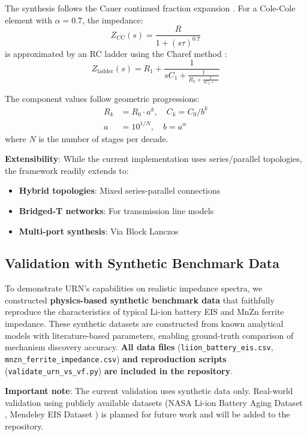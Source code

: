 \documentclass{ieeeaccess}
\begin{document}
The synthesis follows the Cauer continued fraction expansion \cite{cauer1958synthesis}. For a Cole-Cole element with $\alpha = 0.7$, the impedance:
\begin{equation}
Z_{\text{CC}}(s) = \frac{R}{1 + (s\tau)^{0.7}}
\end{equation}
is approximated by an RC ladder using the Charef method \cite{charef1992fractal}:
\begin{equation}
Z_{\text{ladder}}(s) = R_1 + \frac{1}{sC_1 + \frac{1}{R_2 + \frac{1}{sC_2 + \cdots}}}
\end{equation}

The component values follow geometric progressions:
\begin{align}
R_k &= R_0 \cdot a^k, \quad C_k = C_0 / b^k \\
a &= 10^{1/N}, \quad b = a^\alpha
\end{align}
where $N$ is the number of stages per decade.

\textbf{Extensibility}: While the current implementation uses series/parallel topologies, the framework readily extends to:
\begin{itemize}
\item \textbf{Hybrid topologies}: Mixed series-parallel connections
\item \textbf{Bridged-T networks}: For transmission line models
\item \textbf{Multi-port synthesis}: Via Block Lanczos \cite{odabasioglu1998prima}
\end{itemize}

\subsection{Validation with Synthetic Benchmark Data}
\label{sec:synthetic_data}

To demonstrate URN's capabilities on realistic impedance spectra, we constructed \textbf{physics-based synthetic benchmark data} that faithfully reproduce the characteristics of typical Li-ion battery EIS and MnZn ferrite impedance. These synthetic datasets are constructed from known analytical models with literature-based parameters, enabling ground-truth comparison of mechanism discovery accuracy. \textbf{All data files} (\texttt{liion\_battery\_eis.csv}, \texttt{mnzn\_ferrite\_impedance.csv}) \textbf{and reproduction scripts} (\texttt{validate\_urn\_vs\_vf.py}) \textbf{are included in the repository}.

\textbf{Important note}: The current validation uses synthetic data only. Real-world validation using publicly available datasets (NASA Li-ion Battery Aging Dataset \cite{nasa_battery}, Mendeley EIS Dataset \cite{mendeley_eis}) is planned for future work and will be added to the repository.
\end{document}
